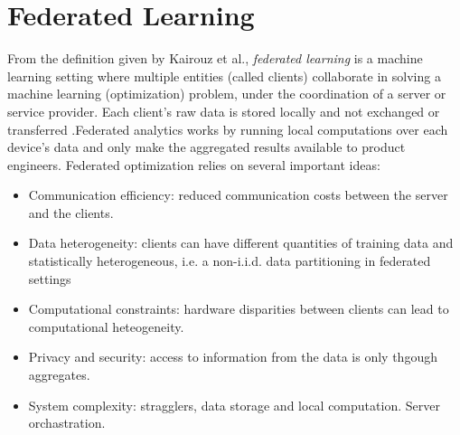 \documentclass[10pt,a4paper]{book}
\theoremstyle{definition}
\theoremstyle{plain}
\theoremstyle{remark}
\begin{document}

\chapter{Federated Learning}

From the definition given by Kairouz et al., \emph{federated learning} is a machine learning setting where multiple entities (called clients) collaborate in solving a machine learning (optimization) problem, under the coordination of a server or service provider. Each client's raw data is stored locally and not exchanged or transferred .Federated analytics works by running local computations over each device's data and only make the aggregated results available to product engineers. Federated optimization relies on several important ideas:
\begin{itemize}
\item Communication efficiency: reduced communication costs between the server and the clients.
\item Data heterogeneity: clients can have different quantities of training data and statistically heterogeneous, i.e. a non-i.i.d. data partitioning in federated settings
\item Computational constraints: hardware disparities between clients can lead to computational heteogeneity.
\item Privacy and security: access to information from the data is only thgough aggregates.
\item System complexity: stragglers, data storage and local computation. Server orchastration. 
\end{itemize}
\end{document}
